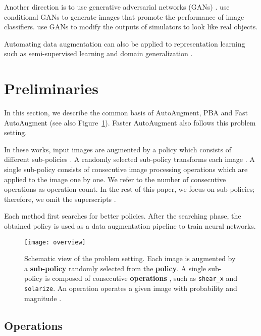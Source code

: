 \documentclass[10pt,twocolumn,letterpaper]{article}
\def\Figref#1{Figure~\ref{#1}}
\newcommand{\autoaugment}{AutoAugment\xspace}
\newcommand{\faster}{Faster \autoaugment}
\newcommand{\fast}{Fast \autoaugment}
\begin{document}
Another direction is to use generative adversarial networks (GANs) \cite{Goodfellow2014b}. \cite{Tran2017a,Antoniou2019a} use conditional GANs to generate images that promote the performance of image classifiers. \cite{Shrivastava2017a,Sixt2018} use GANs to modify the outputs of simulators to look like real objects. 

Automating data augmentation can also be applied to representation learning such as semi-supervised learning \cite{Berthelot2019,Xie2019} and domain generalization \cite{Volpi2018}.


\section{Preliminaries}


In this section, we describe the common basis of \autoaugment \cite{Cubuk2018}, PBA \cite{Ho2019} and \fast \cite{Lim2019} (see also \Figref{fig:overview}). \faster also follows this problem setting.

In these works, input images are augmented by a policy which consists of  different sub-policies . A randomly selected sub-policy transforms each image . A single sub-policy consists of  consecutive image processing operations  which are applied to the image one by one. We refer to the number of consecutive operations  as operation count. In the rest of this paper, we focus on sub-policies; therefore, we omit the superscripts .

Each method first searches for better policies. After the searching phase, the obtained policy is used as a data augmentation pipeline to train neural networks.

\begin{figure}
    \centering
    \texttt{[image: overview]}
    \caption{Schematic view of the problem setting. Each image is augmented by a \textbf{sub-policy} randomly selected from the \textbf{policy}. A single sub-policy is composed of  consecutive \textbf{operations} , such as \texttt{shear\_x} and \texttt{solarize}. An operation  operates a given image with probability  and magnitude .}
    \label{fig:overview}
\end{figure}

\subsection{Operations}\label{sub:operations}
\end{document}
